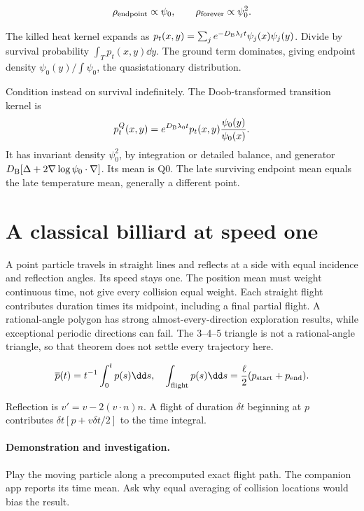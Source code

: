 \documentclass[11pt,oneside,openany]{book}
\begin{document}
\[\rho_{\rm endpoint}\propto\psi_0,\qquad\rho_{\rm forever}\propto\psi_0^2.\]



The killed heat kernel expands as
$p_t(x,y)=\sum_j e^{-D_{\rm B}\lambda_jt}\psi_j(x)\psi_j(y)$.
Divide by survival probability $\int_Tp_t(x,y)\dd y$.
The ground term dominates, giving endpoint density
$\psi_0(y)/\int\psi_0$, the quasistationary distribution.

Condition instead on survival indefinitely. The Doob-transformed
transition kernel is
\[
p_t^Q(x,y)=e^{D_{\rm B}\lambda_0t}
p_t(x,y)\frac{\psi_0(y)}{\psi_0(x)}.
\]
It has invariant density $\psi_0^2$, by integration or detailed
balance, and generator
$D_{\rm B}[\Delta+2\nabla\log\psi_0\cdot\nabla]$.
Its mean is Q0. The late surviving endpoint mean equals the late
temperature mean, generally a different point.




\section{A classical billiard at speed one}\label{sec:slide58}

A point particle travels in straight lines and reflects at a side with equal incidence and reflection angles. Its speed stays one. The position mean must weight continuous time, not give every collision equal weight. Each straight flight contributes duration times its midpoint, including a final partial flight. A rational-angle polygon has strong almost-every-direction exploration results, while exceptional periodic directions can fail. The 3--4--5 triangle is not a rational-angle triangle, so that theorem does not settle every trajectory here.


\[\overline p(t)=t^{-1}\int_0^tp(s)\dd s,\quad\int_{\rm flight}p(s)\dd s=\frac{\ell}{2}(p_{\rm start}+p_{\rm end}).\]


Reflection is $v'=v-2(v\cdot n)n$. A flight of duration
$\delta t$ beginning at $p$ contributes
$\delta t[p+v\delta t/2]$ to the time integral.



\paragraph{Demonstration and investigation.} Play the moving particle along a precomputed exact flight path. The companion app reports its time mean. Ask why equal averaging of collision locations would bias the result.
\end{document}

